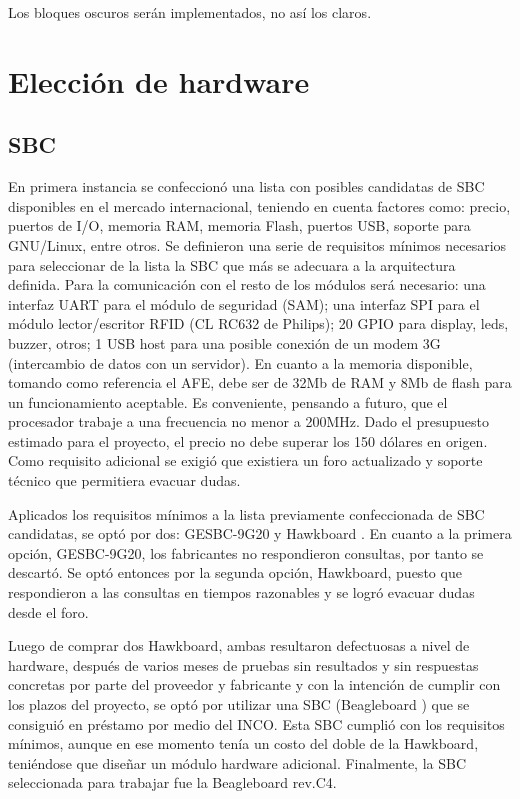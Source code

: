 Los bloques oscuros serán implementados, no así los claros.


\newpage
\section{Elecci\'on de hardware}

\subsection{SBC}
En primera instancia se confeccionó una lista con posibles candidatas de SBC disponibles
en el mercado internacional, teniendo en cuenta factores como: precio, puertos de I/O, memoria RAM, memoria Flash, puertos USB, soporte para GNU/Linux, entre otros.
Se definieron una serie de requisitos mínimos necesarios para seleccionar de la lista la SBC que más se adecuara a la arquitectura definida.
Para la comunicación con el resto de los módulos será necesario: una interfaz UART para el módulo de seguridad (SAM); una interfaz SPI para el módulo lector/escritor RFID (CL RC632 de Philips); 20 GPIO para display, leds, buzzer, otros; 1 USB host para una posible conexión de un modem 3G (intercambio de datos con un servidor). En cuanto a la memoria disponible, tomando como referencia el AFE, debe ser de 32Mb de RAM y 8Mb de flash para un funcionamiento aceptable. Es conveniente, pensando a futuro, que el procesador trabaje a una frecuencia no menor a 200MHz.
Dado el presupuesto estimado para el proyecto, el precio no debe superar los 150 dólares en origen.
Como requisito adicional se exigió que existiera un foro actualizado y soporte técnico que permitiera evacuar dudas.


Aplicados los requisitos mínimos a la lista previamente confeccionada de SBC candidatas, se optó por dos: GESBC-9G20 \cite{9G20} y Hawkboard \cite{Hawk}.
En cuanto a la primera opción, GESBC-9G20, los fabricantes no respondieron consultas, por tanto se descartó. Se optó entonces por la segunda opción, Hawkboard, puesto que respondieron a las consultas en tiempos razonables y se logró evacuar dudas desde el foro.


Luego de comprar dos Hawkboard, ambas resultaron defectuosas a nivel de hardware, después de varios meses de pruebas sin resultados y sin respuestas concretas por parte del proveedor y fabricante y con la intención de cumplir con los plazos del proyecto, se optó por utilizar una SBC (Beagleboard \cite{Beagle}) que se consiguió en préstamo por medio del INCO. Esta SBC cumplió con los requisitos mínimos, aunque en ese momento tenía un costo del doble de la Hawkboard, teniéndose que diseñar un módulo hardware adicional.
Finalmente, la SBC seleccionada para trabajar fue la Beagleboard rev.C4.

